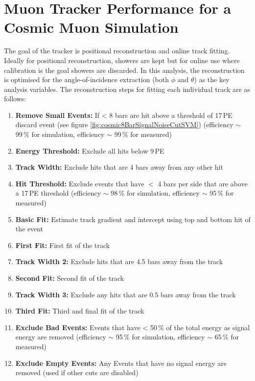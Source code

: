\section{Muon Tracker Performance for a Cosmic Muon Simulation}\label{sec:SimulationOfCosmics}
The goal of the tracker is positional reconstruction and online track fitting. Ideally for positional reconstruction, showers are kept but for online use where calibration is the goal showers are discarded. In this analysis, the reconstruction is optimised for the angle-of-incidence extraction (both $\phi$ and $\theta$) as the key analysis variables. The reconstruction steps for fitting each individual track are as follows: 
\begin{enumerate}
  \item \textbf{Remove Small Events:} If < 8 bars are hit above a threshold of 17\,PE discard event (see figure \ref{fig:cosmic8BarSignalNoiseCutSVM}) (efficiency $\sim$ 99\,\% for simulation, efficiency $\sim$ 99\,\% for measured)
  \item \textbf{Energy Threshold:} Exclude all hits below 9\,PE
  \item \textbf{Track Width:} Exclude hits that are 4 bars away from any other hit 
  \item \textbf{Hit Threshold:} Exclude events that have $<$ 4 bars per side that are above a 17\,PE threshold (efficiency $\sim$ 98\,\% for simulation, efficiency $\sim$ 95\,\% for measured)
  \item \textbf{Basic Fit:} Estimate track gradient and intercept using top and bottom hit of the event
  \item \textbf{First Fit:} First fit of the track 
  \item \textbf{Track Width 2:} Exclude hits that are 4.5 bars away from the track
  \item \textbf{Second Fit:} Second fit of the track
  \item \textbf{Track Width 3:} Exclude any hits that are 0.5 bars away from the track
  \item \textbf{Third Fit:} Third and final fit of the track
  \item \textbf{Exclude Bad Events:} Events that have < 50\,\% of the total energy as signal energy are removed (efficiency $\sim$ 95\,\% for simulation, efficiency $\sim$ 65\,\% for measured)
  \item \textbf{Exclude Empty Events:} Any Events that have no signal energy are removed (used if other cuts are disabled) 
\end{enumerate}
